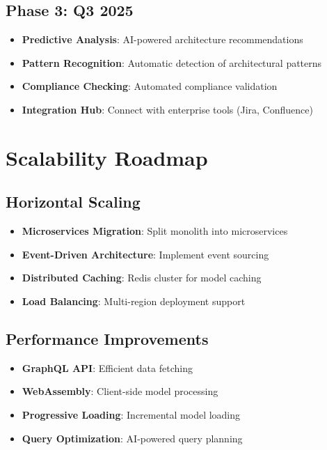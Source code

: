\documentclass[12pt,a4paper]{report}
\begin{document}
\subsection{Phase 3: Q3 2025}
\begin{itemize}
    \item \textbf{Predictive Analysis}: AI-powered architecture recommendations
    \item \textbf{Pattern Recognition}: Automatic detection of architectural patterns
    \item \textbf{Compliance Checking}: Automated compliance validation
    \item \textbf{Integration Hub}: Connect with enterprise tools (Jira, Confluence)
\end{itemize}

\section{Scalability Roadmap}

\subsection{Horizontal Scaling}
\begin{itemize}
    \item \textbf{Microservices Migration}: Split monolith into microservices
    \item \textbf{Event-Driven Architecture}: Implement event sourcing
    \item \textbf{Distributed Caching}: Redis cluster for model caching
    \item \textbf{Load Balancing}: Multi-region deployment support
\end{itemize}

\subsection{Performance Improvements}
\begin{itemize}
    \item \textbf{GraphQL API}: Efficient data fetching
    \item \textbf{WebAssembly}: Client-side model processing
    \item \textbf{Progressive Loading}: Incremental model loading
    \item \textbf{Query Optimization}: AI-powered query planning
\end{itemize}
\end{document}
